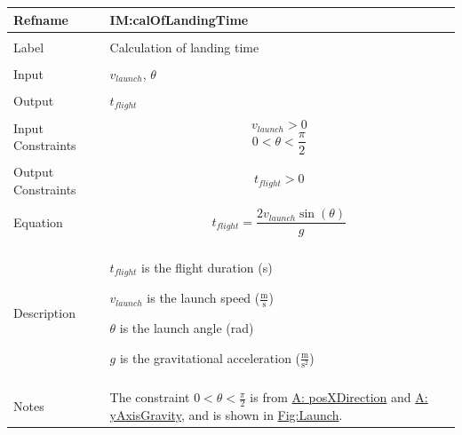 \documentclass[12pt]{article}
\begin{document}
\noindent \begin{minipage}{\textwidth}
\begin{tabular}{>{\raggedright}p{}>{\raggedright\arraybackslash}p{}}
\toprule \textbf{Refname} & \textbf{IM:calOfLandingTime}
\label{IM:calOfLandingTime}
\\ \midrule \\
Label & Calculation of landing time
\\ \midrule \\
Input & ${v_{launch}}$, $θ$
\\ \midrule \\
Output & ${t_{flight}}$
\\ \midrule \\
Input Constraints & \begin{displaymath}
                    {v_{launch}}>0
                    \end{displaymath}
                    \begin{displaymath}
                    0<θ<\frac{π}{2}
                    \end{displaymath}
\\ \midrule \\
Output Constraints & \begin{displaymath}
                     {t_{flight}}>0
                     \end{displaymath}
\\ \midrule \\
Equation & \begin{displaymath}
           {t_{flight}}=\frac{2 {v_{launch}} \sin\left(θ\right)}{g}
           \end{displaymath}
\\ \midrule \\
Description & \begin{symbDescription}
              \item{${t_{flight}}$ is the flight duration (s)}
              \item{${v_{launch}}$ is the launch speed ($\frac{\text{m}}{\text{s}}$)}
              \item{$θ$ is the launch angle (rad)}
              \item{$g$ is the gravitational acceleration ($\frac{\text{m}}{\text{s}^{2}}$)}
              \end{symbDescription}
\\ \midrule \\
Notes & The constraint $0<θ<\frac{π}{2}$ is from \hyperref[posXDirection]{A: posXDirection} and \hyperref[yAxisGravity]{A: yAxisGravity}, and is shown in \hyperref[Figure:Launch]{Fig:Launch}.

\end{tabular}
\end{minipage}
\end{document}
